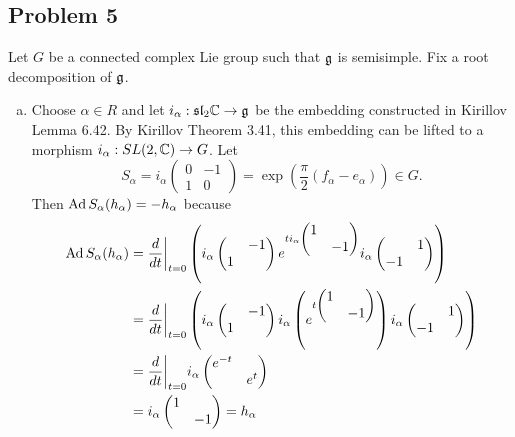 \documentclass{../../mathnotes}
\begin{document}
\subsection*{Problem 5}

Let $G$ be a connected complex Lie group such that $\mathfrak g$ is semisimple. Fix a root decomposition of $\mathfrak g$.
\begin{enumerate}[(a)]
    \item Choose $\alpha\in R$ and let $i_\alpha:\mathfrak{sl}_2\mathbb{C}\to\mathfrak g$ be the embedding constructed in Kirillov Lemma 6.42.
        By Kirillov Theorem 3.41, this embedding can be lifted to a morphism $i_\alpha:SL(2,\mathbb{C})\to G$.
        Let
        \[
            S_\alpha=i_\alpha\begin{pmatrix}0&-1\\1&0\end{pmatrix}=\exp\left( \frac{\pi}{2}(f_\alpha-e_\alpha) \right)\in G.
        \]
        Then $\operatorname{Ad} S_\alpha(h_\alpha)=-h_\alpha$ because
        \begin{align*}
            \operatorname{Ad} S_\alpha(h_\alpha)&=\frac{d}{dt}\bigg|_{t=0}\left( i_\alpha\begin{pmatrix}&-1\\1&\end{pmatrix}e^{ti_\alpha\begin{pmatrix}1&\\&-1\end{pmatrix}}i_\alpha\begin{pmatrix}&1\\-1&\end{pmatrix} \right)\\
            &=\frac{d}{dt}\bigg|_{t=0}\left( i_\alpha\begin{pmatrix}&-1\\1&\end{pmatrix}i_\alpha\left(e^{t\begin{pmatrix}1&\\&-1\end{pmatrix}}\right)i_\alpha\begin{pmatrix}&1\\-1&\end{pmatrix} \right)\\
            &=\frac{d}{dt}\bigg|_{t=0}i_\alpha\begin{pmatrix}e^{-t}&\\&e^t\end{pmatrix}\\
            &=i_\alpha\begin{pmatrix}1&\\&-1\end{pmatrix}=h_\alpha
        \end{align*}


\end{enumerate}
\end{document}
